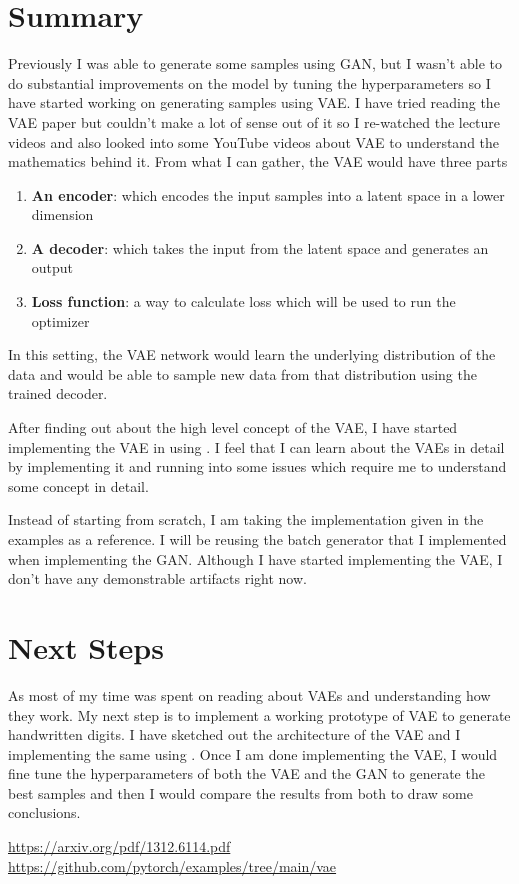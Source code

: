 \documentclass{article}
\begin{document}
\thispagestyle{firstpage}

\section{Summary}

Previously I was able to generate some samples using GAN, but I wasn't able to do substantial improvements on the model by tuning the hyperparameters so I have started working on generating samples using VAE. I have tried reading the VAE paper \cite{1} but couldn't make a lot of sense out of it so I re-watched the lecture videos and also looked into some YouTube videos about VAE to understand the mathematics behind it. From what I can gather, the VAE would have three parts 
\begin{enumerate}
    \item \textbf{An encoder}: which encodes the input samples into a latent space in a lower dimension
    \item \textbf{A decoder}: which takes the input from the latent space and generates an output
    \item \textbf{Loss function}: a way to calculate loss which will be used to run the optimizer
\end{enumerate}
In this setting, the VAE network would learn the underlying distribution of the data and would be able to sample new data from that distribution using the trained decoder. 

After finding out about the high level concept of the VAE, I have started implementing the VAE in  using . I feel that I can learn about the VAEs in detail by implementing it and running into some issues which require me to understand some concept in detail.

Instead of starting from scratch, I am taking the  implementation given in the  examples \cite{2} as a reference. I will be reusing the batch generator that I implemented when implementing the GAN. Although I have started implementing the VAE, I don't have any demonstrable artifacts right now.


\section{Next Steps}

As most of my time was spent on reading about VAEs and understanding how they work. My next step is to implement a working prototype of VAE to generate handwritten digits. I have sketched out the architecture of the VAE and I implementing the same using . Once I am done implementing the VAE, I would fine tune the hyperparameters of both the VAE and the GAN to generate the best samples and then I would compare the results from both to draw some conclusions.


\begin{thebibliography}{1}

 \url{https://arxiv.org/pdf/1312.6114.pdf}
 \url{https://github.com/pytorch/examples/tree/main/vae}
\end{thebibliography}
\end{document}
